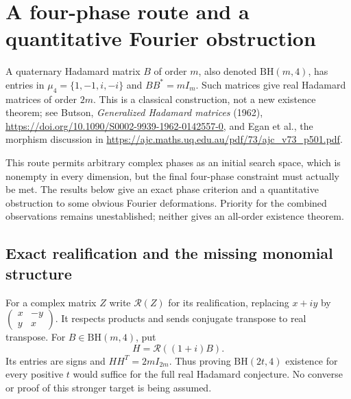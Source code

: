 \section{A four-phase route and a quantitative Fourier obstruction}
\label{sec:four-phase-route}

A quaternary Hadamard matrix $B$ of order $m$, also denoted
$\mathrm{BH}(m,4)$, has entries in $\mu_4=\{1,-1,i,-i\}$ and
$BB^*=mI_m$. Such matrices give real Hadamard matrices of order
$2m$. This is a classical construction, not a new existence theorem;
see Butson, \emph{Generalized Hadamard matrices} (1962),
\url{https://doi.org/10.1090/S0002-9939-1962-0142557-0},
and Egan et al., the morphism discussion in
\url{https://ajc.maths.uq.edu.au/pdf/73/ajc_v73_p501.pdf}.

This route permits arbitrary complex phases as an initial search
space, which is nonempty in every dimension, but the final four-phase
constraint must actually be met. The results below give an exact
phase criterion and a quantitative obstruction to some obvious
Fourier deformations. Priority for the combined observations remains
unestablished; neither gives an all-order existence theorem.

\subsection{Exact realification and the missing monomial structure}
For a complex matrix $Z$ write $\mathcal R(Z)$ for its realification,
replacing $x+iy$ by $\left(\begin{smallmatrix}x&-y\\y&x\end{smallmatrix}\right)$.
It respects products and sends conjugate transpose to real transpose.
For $B\in\mathrm{BH}(m,4)$, put
\[
                   H=\mathcal R((1+i)B).
\]
Its entries are signs and $HH^T=2mI_{2m}$. Thus proving
$\mathrm{BH}(2t,4)$ existence for every positive $t$ would suffice
for the full real Hadamard conjecture. No converse or proof of this
stronger target is being assumed.

